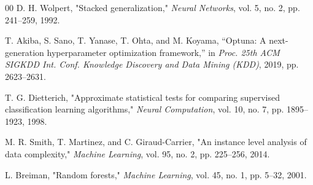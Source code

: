 \documentclass[conference]{IEEEtran}
\begin{document}
\begin{thebibliography}{00}
D. H. Wolpert, 
"Stacked generalization," 
\textit{Neural Networks}, 
vol. 5, no. 2, pp. 241--259, 1992. 

T. Akiba, S. Sano, T. Yanase, T. Ohta, and M. Koyama,
``Optuna: A next-generation hyperparameter optimization framework,''
in \textit{Proc. 25th ACM SIGKDD Int. Conf. Knowledge Discovery
and Data Mining (KDD)}, 2019, pp. 2623--2631.

T. G. Dietterich, 
"Approximate statistical tests for comparing supervised classification learning algorithms," 
\textit{Neural Computation}, 
vol. 10, no. 7, pp. 1895--1923, 1998. 

M. R. Smith, T. Martinez, and C. Giraud-Carrier, 
"An instance level analysis of data complexity," 
\textit{Machine Learning}, 
vol. 95, no. 2, pp. 225--256, 2014. 

L. Breiman, 
"Random forests," 
\textit{Machine Learning}, 
vol. 45, no. 1, pp. 5--32, 2001. 
\end{thebibliography}
\end{document}
